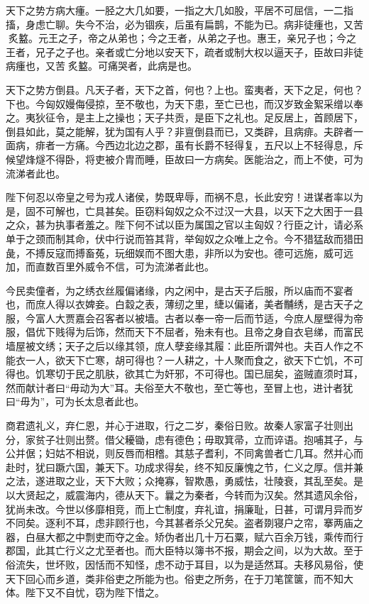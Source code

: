 \documentclass[]{article}
\begin{document}
天下之势方病大瘇。一胫之大几如要，一指之大几如股，平居不可屈信，一二指搐，身虑亡聊。失今不治，必为锢疾，后虽有扁鹊，不能为已。病非徒瘇也，又苦炙盭。元王之子，帝之从弟也；今之王者，从弟之子也。惠王，亲兄子也；今之王者，兄子之子也。亲者或亡分地以安天下，疏者或制大权以逼天子，臣故曰非徒病瘇也，又苦炙盭。可痛哭者，此病是也。

天下之势方倒县。凡天子者，天下之首，何也？上也。蛮夷者，天下之足，何也？下也。今匈奴嫚侮侵掠，至不敬也，为天下患，至亡已也，而汉岁致金絮采缯以奉之。夷狄征令，是主上之操也；天子共贡，是臣下之礼也。足反居上，首顾居下，倒县如此，莫之能解，犹为国有人乎？非亶倒县而已，又类辟，且病痱。夫辟者一面病，痱者一方痛。今西边北边之郡，虽有长爵不轻得复，五尺以上不轻得息，斥候望烽燧不得卧，将吏被介胄而睡，臣故曰一方病矣。医能治之，而上不使，可为流涕者此也。

陛下何忍以帝皇之号为戎人诸侯，势既卑辱，而祸不息，长此安穷！进谋者率以为是，固不可解也，亡具甚矣。臣窃料匈奴之众不过汉一大县，以天下之大困于一县之众，甚为执事者羞之。陛下何不试以臣为属国之官以主匈奴？行臣之计，请必系单于之颈而制其命，伏中行说而笞其背，举匈奴之众唯上之令。今不猎猛敌而猎田彘，不搏反寇而搏畜菟，玩细娱而不图大患，非所以为安也。德可远施，威可远加，而直数百里外威令不信，可为流涕者此也。

今民卖僮者，为之绣衣丝履偏诸缘，内之闲中，是古天子后服，所以庙而不宴者也，而庶人得以衣婢妾。白縠之表，薄纫之里，緁以偏诸，美者黼绣，是古天子之服，今富人大贾嘉会召客者以被墙。古者以奉一帝一后而节适，今庶人屋壁得为帝服，倡优下贱得为后饰，然而天下不屈者，殆未有也。且帝之身自衣皂绨，而富民墙屋被文绣；天子之后以缘其领，庶人孽妾缘其履：此臣所谓舛也。夫百人作之不能衣一人，欲天下亡寒，胡可得也？一人耕之，十人聚而食之，欲天下亡饥，不可得也。饥寒切于民之肌肤，欲其亡为奸邪，不可得也。国已屈矣，盗贼直须时耳，然而献计者曰``毋动为大''耳。夫俗至大不敬也，至亡等也，至冒上也，进计者犹曰``毋为''，可为长太息者此也。

商君遗礼义，弃仁恩，并心于进取，行之二岁，秦俗日败。故秦人家富子壮则出分，家贫子壮则出赘。借父耰锄，虑有德色；毋取箕帚，立而谇语。抱哺其子，与公并倨；妇姑不相说，则反唇而相稽。其慈子耆利，不同禽兽者亡几耳。然并心而赴时，犹曰蹶六国，兼天下。功成求得矣，终不知反廉愧之节，仁义之厚。信并兼之法，遂进取之业，天下大败；众掩寡，智欺愚，勇威怯，壮陵衰，其乱至矣。是以大贤起之，威震海内，德从天下。曩之为秦者，今转而为汉矣。然其遗风余俗，犹尚未改。今世以侈靡相竞，而上亡制度，弃礼谊，捐廉耻，日甚，可谓月异而岁不同矣。逐利不耳，虑非顾行也，今其甚者杀父兄矣。盗者剟寝户之帘，搴两庙之器，白昼大都之中剽吏而夺之金。矫伪者出几十万石粟，赋六百余万钱，乘传而行郡国，此其亡行义之尤至者也。而大臣特以簿书不报，期会之间，以为大故。至于俗流失，世坏败，因恬而不知怪，虑不动于耳目，以为是适然耳。夫移风易俗，使天下回心而乡道，类非俗吏之所能为也。俗吏之所务，在于刀笔筐箧，而不知大体。陛下又不自忧，窃为陛下惜之。
\end{document}
